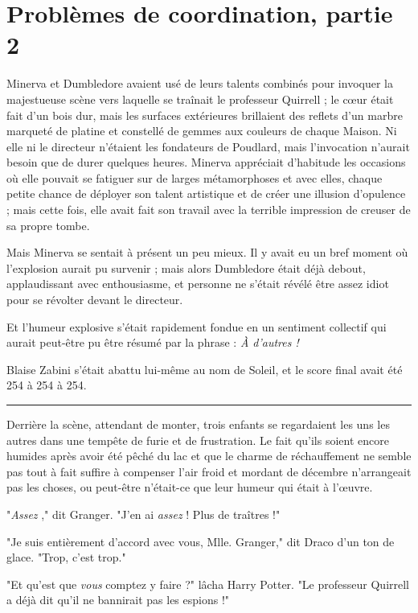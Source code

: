 
\chapter{Problèmes de coordination, partie 2}

Minerva et Dumbledore avaient usé de leurs talents combinés pour invoquer la majestueuse scène vers laquelle se traînait le professeur Quirrell ; le cœur était fait d'un bois dur, mais les surfaces extérieures brillaient des reflets d'un marbre marqueté de platine et constellé de gemmes aux couleurs de chaque Maison. Ni elle ni le directeur n'étaient les fondateurs de Poudlard, mais l'invocation n'aurait besoin que de durer quelques heures. Minerva appréciait d'habitude les occasions où elle pouvait se fatiguer sur de larges métamorphoses et avec elles, chaque petite chance de déployer son talent artistique et de créer une illusion d'opulence ; mais cette fois, elle avait fait son travail avec la terrible impression de creuser de sa propre tombe.

Mais Minerva se sentait à présent un peu mieux. Il y avait eu un bref moment où l'explosion aurait pu survenir ; mais alors Dumbledore était déjà debout, applaudissant avec enthousiasme, et personne ne s'était révélé être assez idiot pour se révolter devant le directeur.

Et l'humeur explosive s'était rapidement fondue en un sentiment collectif qui aurait peut-être pu être résumé par la phrase : \emph{À d'autres !} 

Blaise Zabini s'était abattu lui-même au nom de Soleil, et le score final avait été 254 à 254 à 254.
\par\noindent\rule{\textwidth}{0.4pt}
Derrière la scène, attendant de monter, trois enfants se regardaient les uns les autres dans une tempête de furie et de frustration. Le fait qu'ils soient encore humides après avoir été pêché du lac et que le charme de réchauffement ne semble pas tout à fait suffire à compenser l'air froid et mordant de décembre n'arrangeait pas les choses, ou peut-être n'était-ce que leur humeur qui était à l'œuvre.

"\emph{Assez} ," dit Granger. "J'en ai \emph{assez}  ! Plus de traîtres !"

"Je suis entièrement d'accord avec vous, Mlle. Granger," dit Draco d'un ton de glace. "Trop, c'est trop."

"Et qu'est que \emph{vous}  comptez y faire ?" lâcha Harry Potter. "Le professeur Quirrell a déjà dit qu'il ne bannirait pas les espions !"

